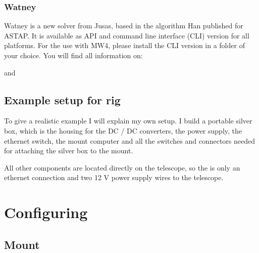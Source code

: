 \documentclass[a4paper,10pt,english]{sphinxmanual}
\begin{document}
\sphinxAtStartPar
{}


\subsubsection{Watney}
\label{\detokenize{install/platesolvers:watney}}
\sphinxAtStartPar
Watney is a new solver from Jusas, based in the algorithm Han published for ASTAP.
It is available as API and command line interface (CLI) version for all platforms.
For the use with MW4, please install the CLI version in a folder of your choice.
You will find all information on:

\sphinxAtStartPar
{}

\sphinxAtStartPar
and

\sphinxAtStartPar
{}

\sphinxstepscope


\subsection{Example setup for rig}
\label{\detokenize{install/example:example-setup-for-rig}}\label{\detokenize{install/example::doc}}
\sphinxAtStartPar
To give a realistic example I will explain my own setup. I build a portable
silver box, which is the housing for the DC / DC converters, the power supply,
the ethernet switch, the mount computer and all the switches and connectors
needed for attaching the silver box to the mount.

\sphinxAtStartPar
All other components are located directly on the telescope, so the is only an
ethernet connection and two 12 V power supply wires to the telescope.


\sphinxstepscope


\section{Configuring}
\label{\detokenize{config/index:configuring}}\label{\detokenize{config/index::doc}}
\sphinxstepscope


\subsection{Mount}
\label{\detokenize{config/mount/index:mount}}\label{\detokenize{config/mount/index::doc}}
\sphinxstepscope
\end{document}
